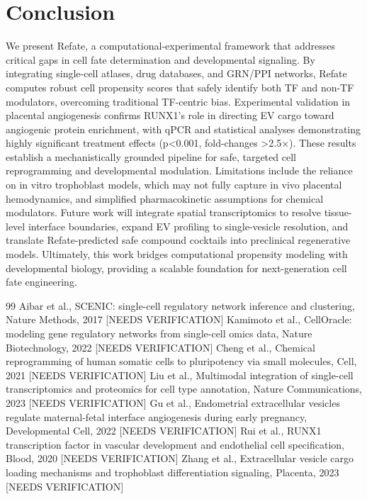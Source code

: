 \documentclass[11pt,a4paper]{article}
\begin{document}
\section{Conclusion}
We present Refate, a computational-experimental framework that addresses critical gaps in cell fate determination and developmental signaling. By integrating single-cell atlases, drug databases, and GRN/PPI networks, Refate computes robust cell propensity scores that safely identify both TF and non-TF modulators, overcoming traditional TF-centric bias. Experimental validation in placental angiogenesis confirms RUNX1's role in directing EV cargo toward angiogenic protein enrichment, with qPCR and statistical analyses demonstrating highly significant treatment effects (p<0.001, fold-changes >2.5×). These results establish a mechanistically grounded pipeline for safe, targeted cell reprogramming and developmental modulation. Limitations include the reliance on in vitro trophoblast models, which may not fully capture in vivo placental hemodynamics, and simplified pharmacokinetic assumptions for chemical modulators. Future work will integrate spatial transcriptomics to resolve tissue-level interface boundaries, expand EV profiling to single-vesicle resolution, and translate Refate-predicted safe compound cocktails into preclinical regenerative models. Ultimately, this work bridges computational propensity modeling with developmental biology, providing a scalable foundation for next-generation cell fate engineering.


\begin{thebibliography}{99}
 Aibar et al., SCENIC: single-cell regulatory network inference and clustering, Nature Methods, 2017 [NEEDS VERIFICATION]
 Kamimoto et al., CellOracle: modeling gene regulatory networks from single-cell omics data, Nature Biotechnology, 2022 [NEEDS VERIFICATION]
 Cheng et al., Chemical reprogramming of human somatic cells to pluripotency via small molecules, Cell, 2021 [NEEDS VERIFICATION]
 Liu et al., Multimodal integration of single-cell transcriptomics and proteomics for cell type annotation, Nature Communications, 2023 [NEEDS VERIFICATION]
 Gu et al., Endometrial extracellular vesicles regulate maternal-fetal interface angiogenesis during early pregnancy, Developmental Cell, 2022 [NEEDS VERIFICATION]
 Rui et al., RUNX1 transcription factor in vascular development and endothelial cell specification, Blood, 2020 [NEEDS VERIFICATION]
 Zhang et al., Extracellular vesicle cargo loading mechanisms and trophoblast differentiation signaling, Placenta, 2023 [NEEDS VERIFICATION]
\end{thebibliography}
\end{document}
